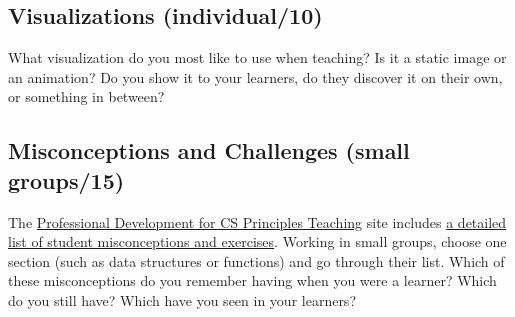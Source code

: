 \subsection{Visualizations (individual/10)}\label{visualizations-individual10}

What visualization do you most like to use when teaching? Is it a static
image or an animation? Do you show it to your learners, do they discover
it on their own, or something in between?

\subsection{Misconceptions and Challenges (small groups/15)}\label{misconceptions-and-challenges-small-groups15}

The \href{http://www.pd4cs.org/}{Professional Development for CS Principles Teaching} site
includes \href{http://www.pd4cs.org/mc-index/}{a detailed list of student misconceptions and
exercises}. Working in small groups, choose one
section (such as data structures or functions) and go through their
list. Which of these misconceptions do you remember having when you
were a learner? Which do you still have? Which have you seen in your
learners?
